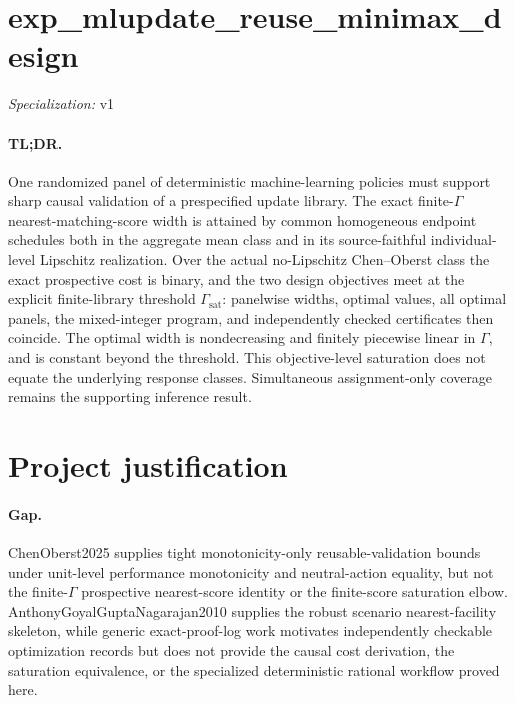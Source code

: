 \documentclass{article}
\begin{document}
\sloppy

\section*{exp\_\allowbreak{}mlupdate\_\allowbreak{}reuse\_\allowbreak{}minimax\_\allowbreak{}design}

\noindent\textit{Specialization:} v1\par

\paragraph{TL;DR.} One randomized panel of deterministic machine-learning policies must support sharp causal validation of a prespecified update library. The exact finite-\(\Gamma\) nearest-matching-score width is attained by common homogeneous endpoint schedules both in the aggregate mean class and in its source-faithful individual-level Lipschitz realization. Over the actual no-Lipschitz Chen--Oberst class the exact prospective cost is binary, and the two design objectives meet at the explicit finite-library threshold \(\Gamma_{\mathrm{sat}}\): panelwise widths, optimal values, all optimal panels, the mixed-integer program, and independently checked certificates then coincide. The optimal width is nondecreasing and finitely piecewise linear in \(\Gamma\), and is constant beyond the threshold. This objective-level saturation does not equate the underlying response classes. Simultaneous assignment-only coverage remains the supporting inference result.

\section{Project justification}

\paragraph{Gap.} ChenOberst2025 supplies tight monotonicity-only reusable-validation bounds under unit-level performance monotonicity and neutral-action equality, but not the finite-\(\Gamma\) prospective nearest-score identity or the finite-score saturation elbow. AnthonyGoyalGuptaNagarajan2010 supplies the robust scenario nearest-facility skeleton, while generic exact-proof-log work motivates independently checkable optimization records but does not provide the causal cost derivation, the saturation equivalence, or the specialized deterministic rational workflow proved here.
\end{document}
